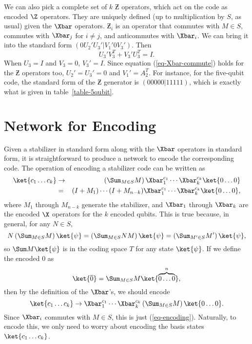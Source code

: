 We can also pick a complete set of $k$ $\Zbar$ operators, which act on the
code as encoded $\Z$ operators.  They are uniquely defined (up to
multiplication by $S$, as usual) given the $\Xbar$ operators.  $\Zbar_i$ is
an operator that commutes with $M \in S$, commutes with $\Xbar_j$ for $i
\neq j$, and anticommutes with $\Xbar_i$.  We can bring it into the
standard form $(0 U_2' U_3' | V_1' 0 V_3')$.  Then
\begin{equation}
	U_3' V_3^T + V_3' U_3^T = I.
\end{equation}
When $U_3 = I$ and $V_3 = 0$, $V_3' = I$.  Since equation
(\ref{eq-Xbar-commute}) holds for the $\Zbar$ operators too, $U_2' = U_3'
= 0$ and $V_1' = A_2^T$.  For instance, for the five-qubit code, the standard
form of the $\Zbar$ generator is $(0 0 0 0 0 | 1 1 1 1 1)$, which is exactly
what is given in table~\ref{table-5qubit}.

\section{Network for Encoding}
\label{sec-encode-network}

Given a stabilizer in standard form along with the $\Xbar$ operators in
standard form, it is straightforward to produce a network to encode the
corresponding code.  The operation of encoding a stabilizer code can be
written as
\begin{eqnarray}
	\ket{c_1 \ldots c_k} & \rightarrow & \left( \Sum_{M \in S} M \right)
	\Xbar_1^{c_1} \cdots \Xbar_k^{c_k} \ket{0 \ldots 0} \label{eq-encoding}\\
	& = & (I + M_1) \cdots (I + M_{n-k}) \Xbar_1^{c_1} \cdots \Xbar_k^{c_k}
	\ket{0\ldots 0}, \label{eq-encoding2}
\end{eqnarray}
where $M_1$ through $M_{n-k}$ generate the stabilizer, and $\Xbar_1$
through $\Xbar_k$ are the encoded $\X$ operators for the $k$ encoded
qubits.  This is true because, in general, for any $N \in S$,
\begin{equation}
	N \left( \Sum_{M \in S} M \right) \ket{\psi} = \left( \Sum_{M \in S} NM
	\right) \ket{\psi} = \left( \Sum_{M' \in S} M' \right) \ket{\psi},
\end{equation}
so $\Sum M \ket{\psi}$ is in the coding space $T$ for any state
$\ket{\psi}$.  If we define the encoded $0$ as
\begin{equation}
	\ket{\overline{0}} = \Sum_{M \in S} M \ket{\overbrace{0 \ldots 0}^{n}},
\end{equation}
then by the definition of the $\Xbar$'s, we should encode
\begin{equation}
	\ket{c_1 \ldots c_k} \rightarrow \Xbar_1^{c_1} \cdots \Xbar_k^{c_k} \left(
	\Sum_{M \in S} M \right)  \ket{0 \ldots 0}.
\end{equation}
Since $\Xbar_i$ commutes with $M \in S$, this is just (\ref{eq-encoding}).
Naturally, to encode this, we only need to worry about encoding the basis
states $\ket{c_1 \ldots c_k}$.

